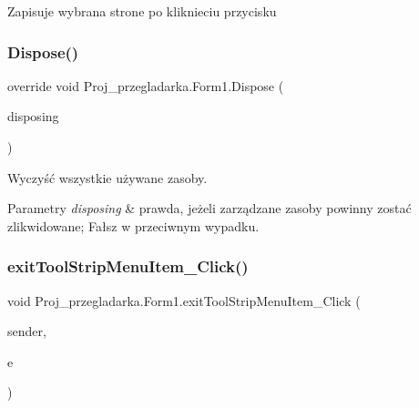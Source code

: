 Zapisuje wybrana strone po kliknieciu przycisku 

\mbox{\label{class_proj__przegladarka_1_1_form1_a36c04a52ed870c6a1bdc93571d690dda}} 
\subsubsection{\texorpdfstring{Dispose()}{Dispose()}}
{\footnotesize\ttfamily override void Proj\+\_\+przegladarka.\+Form1.\+Dispose (\begin{DoxyParamCaption}\item[{bool}]{disposing }\end{DoxyParamCaption})\hspace{0.3cm}{\ttfamily [protected]}}



Wyczyść wszystkie używane zasoby. 


\begin{DoxyParams}{Parametry}
{\em disposing} & prawda, jeżeli zarządzane zasoby powinny zostać zlikwidowane; Fałsz w przeciwnym wypadku.\\
\hline
\end{DoxyParams}
\mbox{\label{class_proj__przegladarka_1_1_form1_a2e0e6d1e396b7362aa371d16c1d598a2}} 
\subsubsection{\texorpdfstring{exitToolStripMenuItem\_Click()}{exitToolStripMenuItem\_Click()}}
{\footnotesize\ttfamily void Proj\+\_\+przegladarka.\+Form1.\+exit\+Tool\+Strip\+Menu\+Item\+\_\+\+Click (\begin{DoxyParamCaption}\item[{object}]{sender,  }\item[{Event\+Args}]{e }\end{DoxyParamCaption})\hspace{0.3cm}{\ttfamily [private]}}



